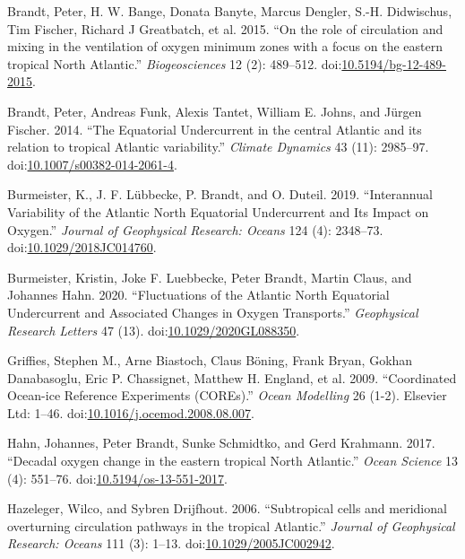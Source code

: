 \documentclass[a4paperpaper,]{article}
\begin{document}
\hypertarget{refs}{}
\hypertarget{ref-Brandt2015}{}
Brandt, Peter, H. W. Bange, Donata Banyte, Marcus Dengler, S.-H.
Didwischus, Tim Fischer, Richard J Greatbatch, et al. 2015. ``On the
role of circulation and mixing in the ventilation of oxygen minimum
zones with a focus on the eastern tropical North Atlantic.''
\emph{Biogeosciences} 12 (2): 489--512.
doi:\href{https://doi.org/10.5194/bg-12-489-2015}{10.5194/bg-12-489-2015}.

\hypertarget{ref-Brandt2014}{}
Brandt, Peter, Andreas Funk, Alexis Tantet, William E. Johns, and Jürgen
Fischer. 2014. ``The Equatorial Undercurrent in the central Atlantic and
its relation to tropical Atlantic variability.'' \emph{Climate Dynamics}
43 (11): 2985--97.
doi:\href{https://doi.org/10.1007/s00382-014-2061-4}{10.1007/s00382-014-2061-4}.

\hypertarget{ref-Burmeister2019}{}
Burmeister, K., J. F. Lübbecke, P. Brandt, and O. Duteil. 2019.
``Interannual Variability of the Atlantic North Equatorial Undercurrent
and Its Impact on Oxygen.'' \emph{Journal of Geophysical Research:
Oceans} 124 (4): 2348--73.
doi:\href{https://doi.org/10.1029/2018JC014760}{10.1029/2018JC014760}.

\hypertarget{ref-Burmeister2020}{}
Burmeister, Kristin, Joke F. Luebbecke, Peter Brandt, Martin Claus, and
Johannes Hahn. 2020. ``Fluctuations of the Atlantic North Equatorial
Undercurrent and Associated Changes in Oxygen Transports.''
\emph{Geophysical Research Letters} 47 (13).
doi:\href{https://doi.org/10.1029/2020GL088350}{10.1029/2020GL088350}.

\hypertarget{ref-Griffies2009}{}
Griffies, Stephen M., Arne Biastoch, Claus Böning, Frank Bryan, Gokhan
Danabasoglu, Eric P. Chassignet, Matthew H. England, et al. 2009.
``Coordinated Ocean-ice Reference Experiments (COREs).'' \emph{Ocean
Modelling} 26 (1-2). Elsevier Ltd: 1--46.
doi:\href{https://doi.org/10.1016/j.ocemod.2008.08.007}{10.1016/j.ocemod.2008.08.007}.

\hypertarget{ref-Hahn2017}{}
Hahn, Johannes, Peter Brandt, Sunke Schmidtko, and Gerd Krahmann. 2017.
``Decadal oxygen change in the eastern tropical North Atlantic.''
\emph{Ocean Science} 13 (4): 551--76.
doi:\href{https://doi.org/10.5194/os-13-551-2017}{10.5194/os-13-551-2017}.

\hypertarget{ref-Hazeleger2006}{}
Hazeleger, Wilco, and Sybren Drijfhout. 2006. ``Subtropical cells and
meridional overturning circulation pathways in the tropical Atlantic.''
\emph{Journal of Geophysical Research: Oceans} 111 (3): 1--13.
doi:\href{https://doi.org/10.1029/2005JC002942}{10.1029/2005JC002942}.
\end{document}
